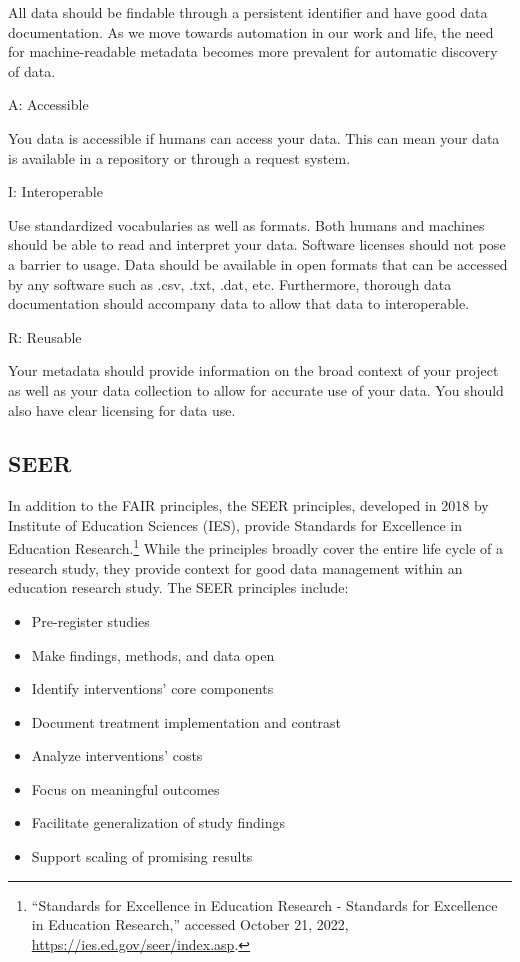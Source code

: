 \documentclass[
]{book}
\providecommand{\tightlist}{%
  \setlength{\itemsep}{0pt}\setlength{\parskip}{0pt}}
\begin{document}
All data should be findable through a persistent identifier and have good data documentation. As we move towards automation in our work and life, the need for machine-readable metadata becomes more prevalent for automatic discovery of data.

A: Accessible

You data is accessible if humans can access your data. This can mean your data is available in a repository or through a request system.

I: Interoperable

Use standardized vocabularies as well as formats. Both humans and machines should be able to read and interpret your data. Software licenses should not pose a barrier to usage. Data should be available in open formats that can be accessed by any software such as .csv, .txt, .dat, etc. Furthermore, thorough data documentation should accompany data to allow that data to interoperable.

R: Reusable

Your metadata should provide information on the broad context of your project as well as your data collection to allow for accurate use of your data. You should also have clear licensing for data use.

\hypertarget{seer}{%
\subsection{SEER}\label{seer}}

In addition to the FAIR principles, the SEER principles, developed in 2018 by Institute of Education Sciences (IES), provide Standards for Excellence in Education Research.\footnote{{``Standards for Excellence in Education Research - Standards for Excellence in Education Research,''} accessed October 21, 2022, \url{https://ies.ed.gov/seer/index.asp}.} While the principles broadly cover the entire life cycle of a research study, they provide context for good data management within an education research study. The SEER principles include:

\begin{itemize}
\tightlist
\item
  Pre-register studies
\item
  Make findings, methods, and data open
\item
  Identify interventions' core components
\item
  Document treatment implementation and contrast
\item
  Analyze interventions' costs
\item
  Focus on meaningful outcomes
\item
  Facilitate generalization of study findings
\item
  Support scaling of promising results
\end{itemize}
\end{document}
